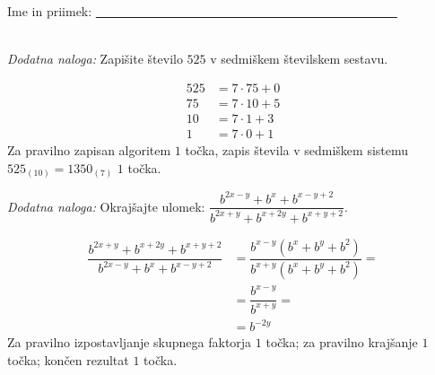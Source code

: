 \documentclass[addpoints]{exam}
\begin{document}
\begin{questions}
\begin{parts}
        \end{parts}








     \newpage

     \noindent Ime in priimek: \underline{~~~~~~~~~~~~~~~~~~~~~~~~~~~~~~~~~~~~~~~~~~~~~~~~}

     ~\\

    \bonusquestion[2]
    \textit{Dodatna naloga:} Zapišite število $525$ v sedmiškem številskem sestavu.

    \begin{solution}[7cm]
        \begin{align*}
            525 &= 7\cdot 75 + 0 \\
            75 &= 7\cdot 10 + 5 \\
            10 &= 7\cdot 1 + 3 \\
            1 &= 7\cdot 0 + 1
        \end{align*}
        Za pravilno zapisan algoritem $1$ točka, zapis števila v sedmiškem sistemu $525_{(10)}=1350_{(7)}$ $1$ točka.
    \end{solution}




        

    \bonusquestion[3]
    \textit{Dodatna naloga:} Okrajšajte ulomek: $\dfrac{b^{2x-y}+b^x+b^{x-y+2}}{b^{2x+y}+b^{x+2y}+b^{x+y+2}}$.

    \begin{solution}[7cm]
        \begin{align*}
            \dfrac{b^{2x+y}+b^{x+2y}+b^{x+y+2}}{b^{2x-y}+b^x+b^{x-y+2}} &= \dfrac{b^{x-y}(b^x+b^y+b^2)}{b^{x+y}(b^x+b^y+b^2)}= \\
                                                                        &= \dfrac{b^{x-y}}{b^{x+y}}= \\
                                                                        &= b^{-2y}
        \end{align*}
        Za pravilno izpostavljanje skupnega faktorja $1$ točka; za pravilno krajšanje $1$ točka; končen rezultat $1$ točka.
    \end{solution}




\end{questions}
\end{document}

